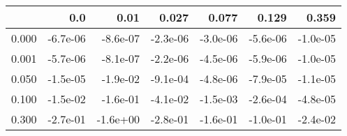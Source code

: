 \begin{tabular}{lrrrrrr}
\toprule
{} &      0.0 &     0.01 &    0.027 &    0.077 &    0.129 &    0.359 \\
\midrule
0.000 & -6.7e-06 & -8.6e-07 & -2.3e-06 & -3.0e-06 & -5.6e-06 & -1.0e-05 \\
0.001 & -5.7e-06 & -8.1e-07 & -2.2e-06 & -4.5e-06 & -5.9e-06 & -1.0e-05 \\
0.050 & -1.5e-05 & -1.9e-02 & -9.1e-04 & -4.8e-06 & -7.9e-05 & -1.1e-05 \\
0.100 & -1.5e-02 & -1.6e-01 & -4.1e-02 & -1.5e-03 & -2.6e-04 & -4.8e-05 \\
0.300 & -2.7e-01 & -1.6e+00 & -2.8e-01 & -1.6e-01 & -1.0e-01 & -2.4e-02 \\
\bottomrule
\end{tabular}
